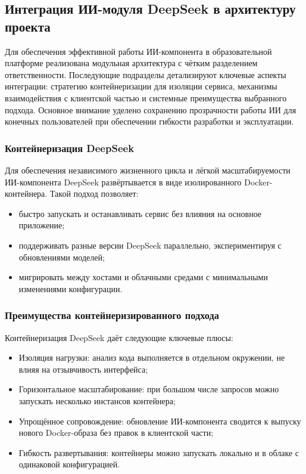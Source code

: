 \subsection{Интеграция ИИ-модуля DeepSeek в архитектуру проекта}

Для обеспечения эффективной работы ИИ-компонента в образовательной платформе реализована модульная архитектура с чётким разделением ответственности. Последующие подразделы детализируют ключевые аспекты интеграции: стратегию контейнеризации для изоляции сервиса, механизмы взаимодействия с клиентской частью и системные преимущества выбранного подхода. Основное внимание уделено сохранению прозрачности работы ИИ для конечных пользователей при обеспечении гибкости разработки и эксплуатации.

\subsubsection{Контейнеризация DeepSeek}
Для обеспечения независимого жизненного цикла и лёгкой масштабируемости ИИ-компонента DeepSeek развёртывается в виде изолированного Docker-контейнера. Такой подход позволяет:

\begin{itemize}
  \item быстро запускать и останавливать сервис без влияния на основное приложение;
  \item поддерживать разные версии DeepSeek параллельно, экспериментируя с обновлениями моделей;
  \item мигрировать между хостами и облачными средами с минимальными изменениями конфигурации.
\end{itemize}

\subsubsection{Преимущества контейнеризированного подхода}
Контейнеризация DeepSeek даёт следующие ключевые плюсы:
\begin{itemize}
  \item Изоляция нагрузки: анализ кода выполняется в отдельном окружении, не влияя на отзывчивость интерфейса;
  \item Горизонтальное масштабирование: при большом числе запросов можно запускать несколько инстансов контейнера;
  \item Упрощённое сопровождение: обновление ИИ-компонента сводится к выпуску нового Docker-образа без правок в клиентской части;
  \item Гибкость развертывания: контейнеры можно запускать локально и в облаке с одинаковой конфигурацией.
\end{itemize}

